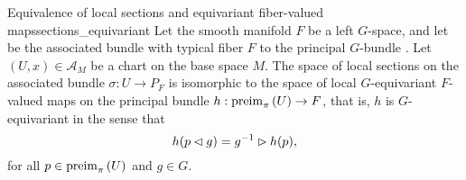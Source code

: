 \begin{theorem}{Equivalence of local sections and equivariant fiber-valued maps}{sections_equivariant}
    Let the smooth manifold \(F\) be a left \(G\)-space, and let  be the associated bundle with typical fiber \(F\) to the principal \(G\)-bundle . Let \((U,x) \in \mathscr{A}_M\) be a chart on the base space \(M\). The space of local sections on the associated bundle \(\sigma : U \to P_F\) is isomorphic to the space of local \(G\)-equivariant \(F\)-valued maps on the principal bundle \(h : \operatorname{preim}_{\pi}{\left(U\right)} \to F\), that is, \(h\) is \(G\)-equivariant in the sense that
    \begin{equation*}
        h(p \mathbin{\vartriangleleft} g) = g^{-1} \mathbin{\vartriangleright} h(p),
    \end{equation*}
    for all \(p \in \operatorname{preim}_{\pi}{\left(U\right)}\) and \(g \in G\).
\end{theorem}
